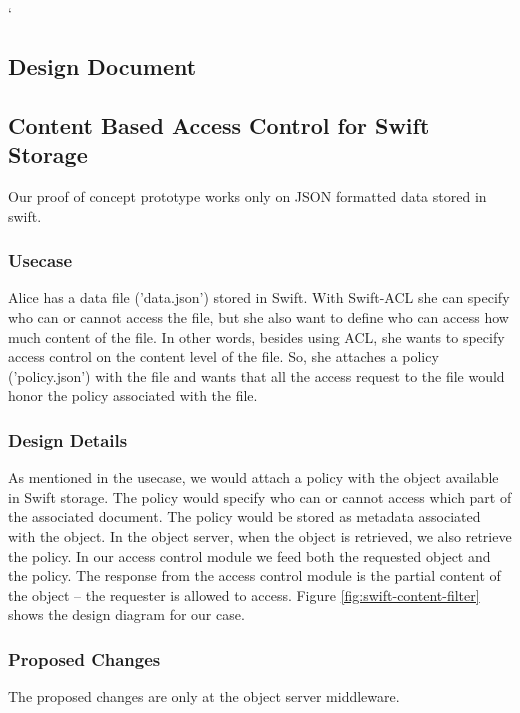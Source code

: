 \newpage
`
\newpage
\begin{appendices}
\section{Design Document} \label{App:design-document}

\subsection{  Content Based Access Control for Swift Storage }
Our proof of concept prototype works only on JSON formatted data stored in swift.

\subsubsection{ Usecase}
Alice has a  data file ('data.json') stored in Swift. With  Swift-ACL she can specify who can or cannot access the file, but she also want to define who can access how much content of the file. In other words,  besides using ACL, she wants to specify access control on the content level of the file.  So, she  attaches a  policy ('policy.json')  with the file and wants that all the access request to the file would honor the policy associated with the file.

\subsubsection{Design Details}
As mentioned in the usecase, we would attach a policy with the object available in  Swift storage. The policy  would specify who can or cannot access which part of the associated document. The policy would be stored as metadata associated with the object. In the object server, when the object is  retrieved, we also retrieve the policy. In our access control module we feed both the requested object and the policy. The response from the access control module is the partial content of the object – the requester is allowed to access. Figure \ref{fig:swift-content-filter} shows the design diagram for our case.

\subsubsection{Proposed Changes}
The proposed changes are only at the object server middleware.

\begin{itemize}


\end{itemize}
\end{appendices}
